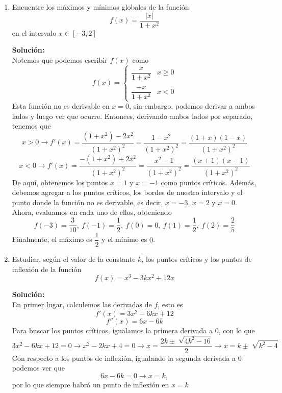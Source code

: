 \documentclass[12pt]{article}
\newenvironment{solucion}
{\begin{mdframed}[backgroundcolor=black!10]
		{\bf Solución:}\\
	}
	{
	\end{mdframed}
}
\newenvironment{preguntas}
{\begin{enumerate}\itemsep12pt
	}
	{
	\end{enumerate}
}
\newcommand{\ra}{\rightarrow}
\begin{document}
\begin{preguntas}
\begin{solucion}
\begin{enumerate}[a)]
Ahora, derivamos nuevamente para clasíficar nuestro punto crítico,
$$f''(x) = 
\dfrac{2(x^2-1) - 4x^2}{(x^2-1)^2} = 
\dfrac{-2 - 2x^2}{(x^2-1)^2} < 0$$
$f''(x)$ es negativa para todo $x$, por lo que $x = -1 - \sqrt[]{2}$ es un máximo local.
\end{enumerate}
\end{solucion}
\item Encuentre los máximos y mínimos globales de la función
$$f(x) = \dfrac{|x|}{1+x^2}$$
en el intervalo $x \in [-3,2]$
\begin{solucion}
Notemos que podemos escribir $f(x)$ como
$$f(x)= \begin{cases}
\dfrac{x}{1+x^2} & x \geq 0\\\\
\dfrac{-x}{1+x^2} & x < 0
\end{cases}$$
Esta función no es derivable en $x=0$, sin embargo, podemos derivar a ambos lados y luego ver que ocurre. Entonces, derivando ambos lados por separado, tenemos que
$$x > 0 \ra f'(x) = \dfrac{(1+x^2) - 2x^2}{(1+x^2)^2} = \dfrac{1-x^2}{(1+x^2)^2} = \dfrac{(1+x)(1-x)}{(1+x^2)^2}$$
$$x < 0 \ra f'(x) = \dfrac{-(1+x^2) + 2x^2}{(1+x^2)^2} = \dfrac{x^2-1}{(1+x^2)^2} = \dfrac{(x+1)(x-1)}{(1+x^2)^2}$$
De aquí, obtenemos los puntos $x=1$ y $x=-1$ como puntos críticos. Además, debemos agregar a los puntos críticos, los bordes de nuestro intervalo y el punto donde la función no es derivable, es decir, $x=-3$, $x=2$ y $x=0$.\\

Ahora, evaluamos en cada uno de ellos, obteniendo
$$f(-3) = \dfrac{3}{10},\ f(-1) = \dfrac{1}{2}, \ f(0) = 0, \ f(1) = \dfrac{1}{2}, \ f(2) = \dfrac{2}{5}$$
Finalmente, el máximo es $\dfrac{1}{2}$ y el mínimo es $0$.
\end{solucion}
\item Estudiar, según el valor de la constante $k$, los puntos críticos y los puntos de inflexión de la función
$$f(x) = x^3-3kx^2+12x$$
\begin{solucion}
En primer lugar, calculemos las derivadas de $f$, esto es
$$f'(x) = 3x^2 - 6kx + 12$$
$$f''(x) = 6x - 6k$$
Para buscar los puntos críticos, igualamos la primera derivada a 0, con lo que
$$3x^2 - 6kx + 12 = 0 \ra x^2 - 2kx + 4= 0 \ra x = \dfrac{2k \pm \sqrt[]{4k^2-16}}{2} \ra x = k \pm \sqrt[]{k^2-4}$$
Con respecto a los puntos de inflexión, igualando la segunda derivada a 0 podemos ver que
$$6x- 6k = 0 \ra x = k,$$
por lo que siempre habrá un punto de inflexión en $x=k$\\


\end{solucion}
\end{preguntas}
\end{document}
